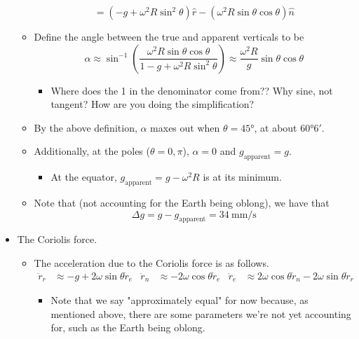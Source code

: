 \documentclass[../notes.tex]{subfiles}
\begin{document}
\begin{itemize}
\begin{itemize}
\begin{equation*}
            = (-g+\omega^2R\sin^2\theta)\hat{r}-(\omega^2R\sin\theta\cos\theta)\hat{n}
        \end{equation*}
        \item Define the angle between the true and apparent verticals to be
        \begin{equation*}
            \alpha \approx \sin^{-1}\left( \frac{\omega^2R\sin\theta\cos\theta}{1-g+\omega^2R\sin^2\theta} \right)
            \approx \frac{\omega^2R}{g}\sin\theta\cos\theta
        \end{equation*}
        \begin{itemize}
            \item Where does the 1 in the denominator come from?? Why sine, not tangent? How are you doing the simplification?
        \end{itemize}
        \item By the above definition, $\alpha$ maxes out when $\theta=\ang{45}$, at about \ang{60}$6'$.
        \item Additionally, at the poles ($\theta=0,\pi$), $\alpha=0$ and $g_\text{apparent}=g$.
        \begin{itemize}
            \item At the equator, $g_\text{apparent}=g-\omega^2R$ is at its minimum.
        \end{itemize}
        \item Note that (not accounting for the Earth being oblong), we have that
        \begin{equation*}
            \Delta g = g-g_\text{apparent} = \SI[per-mode=symbol]{34}{\milli\meter\per\second}
        \end{equation*}
    \end{itemize}
    \item The Coriolis force.
    \begin{itemize}
        \item The acceleration due to the Coriolis force is as follows.
        \begin{align*}
            \ddot{r}_r &\approx -g+2\omega\sin\theta\dot{r}_e&
            \ddot{r}_n &\approx -2\omega\cos\theta\dot{r}_e&
            \ddot{r}_e &\approx 2\omega\cos\theta\dot{r}_n-2\omega\sin\theta\dot{r}_r
        \end{align*}
        \begin{itemize}
            \item Note that we say "approximately equal" for now because, as mentioned above, there are some parameters we're not yet accounting for, such as the Earth being oblong.

\end{itemize}
\end{itemize}
\end{itemize}
\end{document}
